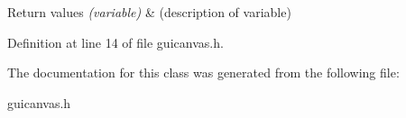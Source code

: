 \begin{DoxyRetVals}{Return values}
{\em (variable)} & (description of variable) \\
\hline
\end{DoxyRetVals}


Definition at line 14 of file guicanvas.\+h.



The documentation for this class was generated from the following file\+:\begin{DoxyCompactItemize}
\item 
guicanvas.\+h\end{DoxyCompactItemize}
